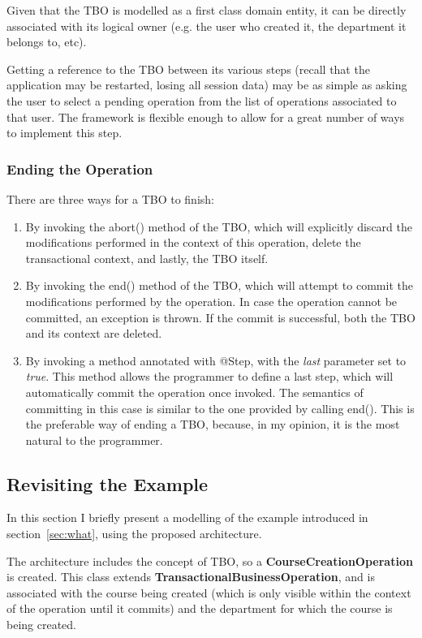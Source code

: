 \documentclass{llncs}
\begin{document}
Given that the TBO is modelled as a first class domain entity, it can
be directly associated with its logical owner (e.g. the user who
created it, the department it belongs to, etc).

Getting a reference to the TBO between its various steps (recall that
the application may be restarted, losing all session data) may be as
simple as asking the user to select a pending operation from the list
of operations associated to that user. The framework is flexible
enough to allow for a great number of ways to implement this step.

\subsubsection{Ending the Operation}

There are three ways for a TBO to finish:
\begin{enumerate}
\item By invoking the abort() method of the TBO, which will explicitly
  discard the modifications performed in the context of this
  operation, delete the transactional context, and lastly, the TBO
  itself.

\item By invoking the end() method of the TBO, which will attempt to
  commit the modifications performed by the operation. In case the
  operation cannot be committed, an exception is thrown. If the commit
  is successful, both the TBO and its context are deleted.

\item By invoking a method annotated with @Step, with the {\it last}
  parameter set to {\it true}. This method allows the programmer to
  define a last step, which will automatically commit the operation
  once invoked. The semantics of committing in this case is similar to
  the one provided by calling end(). This is the preferable way of
  ending a TBO, because, in my opinion, it is the most natural to the
  programmer.
\end{enumerate}

\subsection{Revisiting the Example}

In this section I briefly present a modelling of the example
introduced in section~\ref{sec:what}, using the proposed architecture.

The architecture includes the concept of TBO, so a {\bf
  CourseCreationOperation} is created. This class extends {\bf
  TransactionalBusinessOperation}, and is associated with the course
being created (which is only visible within the context of the
operation until it commits) and the department for which the course is
being created.
\end{document}
